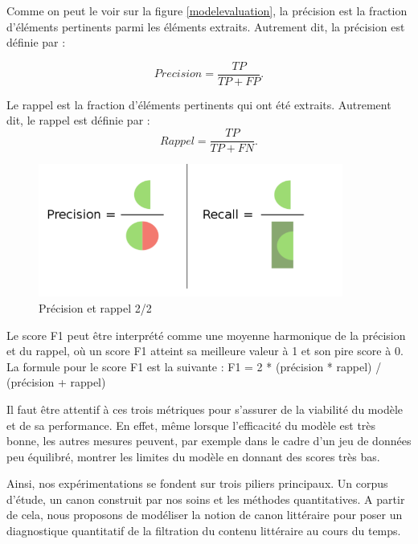 Comme on peut le voir sur la figure \ref{modelevaluation}, la précision est la fraction d'éléments pertinents parmi les éléments extraits. Autrement dit, la précision est définie par : 

\begin{equation}
Precision = \frac{TP}{TP + FP}.
\end{equation}
 

Le rappel est la fraction d'éléments pertinents qui ont été extraits. Autrement dit, le rappel est définie par :
\begin{equation}
Rappel = \frac{TP}{TP + FN}.
\end{equation} 

\bigskip
\begin{figure}[!ht]
    \centering
    \includegraphics[width=10cm]{img/07_preci_recall.png}
    \caption[Précision et rappel 2/2]{Précision et rappel 2/2\footnotemark}
    \label{preci_recall}
\end{figure}


Le score F1 peut être interprété comme une moyenne harmonique de la précision et du rappel, où un score F1 atteint sa meilleure valeur à 1 et son pire score à 0. La formule pour le score F1 est la suivante : F1 = 2 * (précision * rappel) / (précision + rappel)

Il faut être attentif à ces trois métriques pour s'assurer de la viabilité du modèle et de sa performance. En effet, même lorsque l'efficacité du modèle est très bonne, les autres mesures peuvent, par exemple dans le cadre d'un jeu de données peu équilibré, montrer les limites du modèle en donnant des scores très bas.


Ainsi, nos expérimentations se fondent sur trois piliers principaux. Un corpus d'étude, un canon construit par nos soins et les méthodes quantitatives. A partir de cela, nous proposons de modéliser la notion de canon littéraire pour poser un diagnostique quantitatif de la filtration du contenu littéraire au cours du temps.